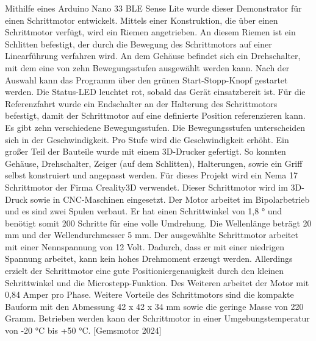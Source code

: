 \documentclass[25pt,a0paper, portrait]{tikzposter}
\begin{document}
\begin{columns}
	{
		{
			Mithilfe eines Arduino Nano 33 BLE Sense Lite wurde dieser Demonstrator für einen Schrittmotor entwickelt. Mittels einer Konstruktion, die über einen Schrittmotor verfügt, wird ein Riemen angetrieben. An diesem Riemen ist ein Schlitten befestigt, der durch die Bewegung des Schrittmotors auf einer Linearführung verfahren wird. An dem Gehäuse befindet sich ein Drehschalter, mit dem eine von zehn Bewegungsstufen ausgewählt werden kann. Nach der Auswahl kann das Programm über den grünen Start-Stopp-Knopf gestartet werden. Die Status-LED leuchtet rot, sobald das Gerät einsatzbereit ist. Für die Referenzfahrt wurde ein Endschalter an der Halterung des Schrittmotors befestigt, damit der Schrittmotor auf eine definierte Position referenzieren kann. Es gibt zehn verschiedene Bewegungsstufen. Die Bewegungsstufen unterscheiden sich in der Geschwindigkeit. Pro Stufe wird die Geschwindigkeit erhöht.
			Ein großer Teil der Bauteile wurde mit einem 3D-Drucker gefertigt. So konnten Gehäuse, Drehschalter, Zeiger (auf dem Schlitten), Halterungen, sowie ein Griff selbst konstruiert und angepasst werden. 
		}
		{
			Für dieses Projekt wird ein Nema 17 Schrittmotor der Firma Creality3D verwendet. Dieser Schrittmotor wird im 3D-Druck sowie in CNC-Maschinen eingesetzt. Der Motor arbeitet im Bipolarbetrieb und es sind zwei Spulen verbaut. Er hat einen Schrittwinkel von 1,8 ° und
			benötigt somit 200 Schritte für eine volle Umdrehung. Die Wellenlänge beträgt 20 mm und der Wellendurchmesser 5 mm. Der ausgewählte Schrittmotor arbeitet mit einer Nennspannung von 12 Volt. Dadurch, dass er mit einer niedrigen Spannung arbeitet, kann kein hohes Drehmoment erzeugt werden. Allerdings erzielt der Schrittmotor eine gute Positioniergenauigkeit durch den kleinen Schrittwinkel und die Microstepp-Funktion. Des Weiteren arbeitet der Motor mit 0,84 Amper pro Phase. Weitere Vorteile des Schrittmotors sind die kompakte Bauform mit den Abmessung 42 x 42 x 34 mm sowie die geringe Masse von 220 Gramm. Betrieben werden kann der Schrittmotor in einer Umgebungstemperatur von -20 °C bis +50 °C. [Gemsmotor 2024] 
		}
	}
\end{columns}
\end{document}
